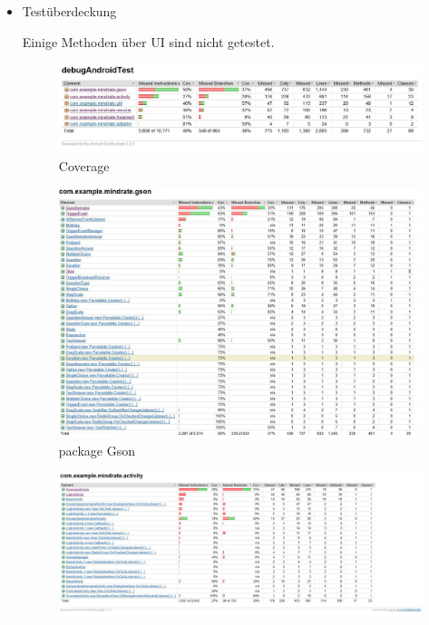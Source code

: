 \documentclass[a4paper]{scrreprt}
\begin{document}
\begin{itemize}
                \item Test\"uberdeckung
                \par Einige Methoden über UI sind nicht getestet.
                \begin{figure}[ht]
                    \centering
                    \includegraphics[scale = 0.5]{Coverage.jpg}
                    \caption{Coverage}
                \end{figure}
                \begin{figure}[ht]
                    \centering
                    \includegraphics[scale = 0.5]{packageGson.jpg}
                    \caption{package Gson}
                \end{figure}
                \begin{figure}[ht]
                    \centering
                    \includegraphics[scale = 0.4]{packageActivity.jpg}

\end{figure}
\end{itemize}
\end{document}
